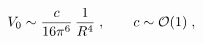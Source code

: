 \begin{equation}
\label{eq:vacuum}
V_0 \sim \frac{c}{16\pi^6}\, \frac{1}{R^4}\;, \qquad c \sim {\cal O}(1) \;,
\end{equation}

